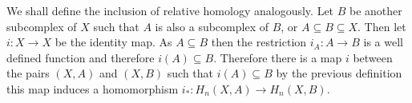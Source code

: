 We shall define the inclusion of relative homology analogously. Let $B$ be another subcomplex of $X$ such that $A$ is also a subcomplex of $B$, or $A \subseteq B \subseteq X$. Then let $i : X \to X$ be the identity map. As $A \subseteq B$ then the restriction $i_A: A \to B$ is a well defined function and therefore $i(A) \subseteq B$. Therefore there is a map $i$ between the pairs $(X, A)$ and $(X, B)$ such that $i(A) \subseteq B$ by the previous definition this map induces a homomorphism $i_* : H_n(X, A) \to H_n(X, B)$.


